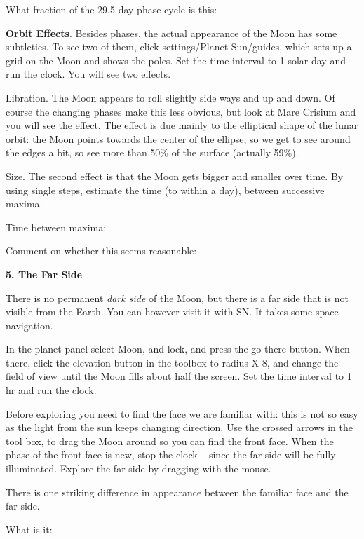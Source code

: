 \documentclass[12pt]{article}
\begin{document}
\medskip
What fraction of the 29.5 day phase cycle is this: \makebox[4cm]{\hrulefill}

\bigskip
\noindent
{\bf Orbit Effects}. Besides phases, the actual appearance of the Moon
has some subtleties. To see two of them, click
settings/Planet-Sun/guides, which sets up a grid on the Moon and shows
the poles. Set the time interval to 1 solar day and run the clock.
You will see two effects.

\medskip\noindent Libration. The Moon appears to roll slightly side
ways and up and down. Of course the changing phases make this less
obvious, but look at Mare Crisium and you will see the effect. The
effect is due mainly to the elliptical shape of the lunar orbit: the
Moon points towards the center of the ellipse, so we get to see around
the edges a bit, so see more than 50\% of the surface (actually
59\%).

\medskip\noindent Size. The second effect is that the Moon gets
bigger and smaller over time. By using single steps, estimate the time
(to within a day), between successive maxima.

\medskip
Time between maxima: \makebox[4cm]{\hrulefill}

Comment on whether this
seems reasonable: \makebox[4cm]{\hrulefill}


\bigskip
\noindent
{\bf 5. The Far Side} 

\medskip
\noindent
There is no permanent \emph{dark side} of the Moon, but there is a far side
that is not visible from the Earth. You can however visit it with
SN. It takes some space navigation.


In the planet panel select Moon, and lock, and press the go there
button. When there, click the elevation button in the toolbox to radius
X 8,  and change the field of view until the Moon fills about half
the screen. Set the
time interval to 1 hr and run the clock.

Before exploring you need to find the face we are familiar with: this
is not so easy as the light from the sun keeps changing direction. Use
the crossed arrows in the tool box, to drag the Moon around so you can
find the front face. When the phase of the front face is new, stop the
clock -- since the far side will be fully illuminated. Explore the far side by dragging with the mouse.

\medskip\noindent
There is one striking difference in appearance between the familiar
face and the far side.

\medskip
What is it: \makebox[12cm]{\hrulefill}
 

\medskip
\noindent
\end{document}
